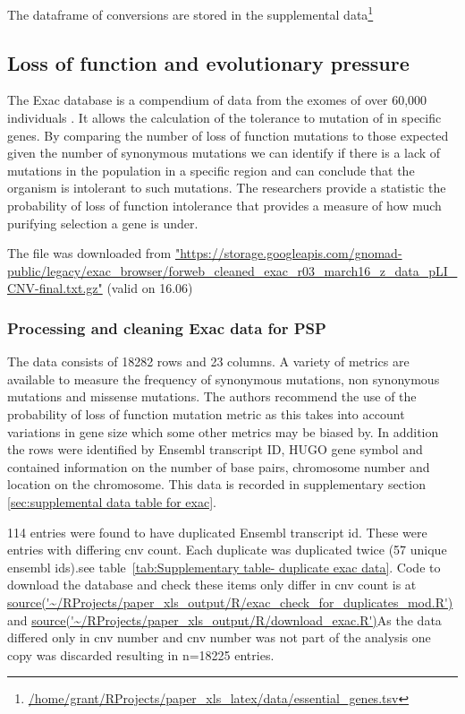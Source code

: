  The dataframe of conversions are stored in the supplemental data\footnote{ \url{/home/grant/RProjects/paper_xls_latex/data/essential_genes.tsv}}
\subsection{Loss of function and evolutionary pressure}

The Exac database is a compendium of data from the exomes of over 60,000 individuals \cite{lek2016analysis}. It allows the calculation of the tolerance to mutation of in specific genes. By comparing the number of loss of function mutations to those expected given the number of synonymous mutations we can identify if there is a lack of mutations in the population in a specific region and can conclude that the organism is intolerant to such mutations. The researchers provide a statistic the probability of loss of function intolerance that provides a measure of how much purifying selection a gene is under. 

The file was downloaded from 
\url{"https://storage.googleapis.com/gnomad-public/legacy/exac_browser/forweb_cleaned_exac_r03_march16_z_data_pLI_CNV-final.txt.gz"} (valid on 16.06)

\subsubsection{Processing and cleaning Exac data for PSP}
The data consists of 18282 rows and 23 columns. A variety of metrics are available to measure the frequency of synonymous mutations, non synonymous mutations and missense mutations. The authors recommend the use of the probability of loss of function mutation metric as this takes into account variations in gene size which some other metrics may be biased by. In addition the rows were identified by Ensembl transcript ID, HUGO gene symbol and contained information on the number of base pairs, chromosome number and location on the chromosome. This data is recorded in supplementary section~
\ref{sec:supplemental data table for exac}.


114 entries were found to have duplicated Ensembl transcript id. These were entries with differing cnv count. Each duplicate was duplicated twice (57 unique ensembl ids).see table~\ref{tab:Supplementary table- duplicate exac data}. Code to download the database and check these items only differ in cnv count is at \url{source('~/RProjects/paper_xls_output/R/exac_check_for_duplicates_mod.R')} and
\url{source('~/RProjects/paper_xls_output/R/download_exac.R')}As the data differed only in cnv number and cnv number was not part of the analysis one copy was discarded resulting in n=18225 entries. 

